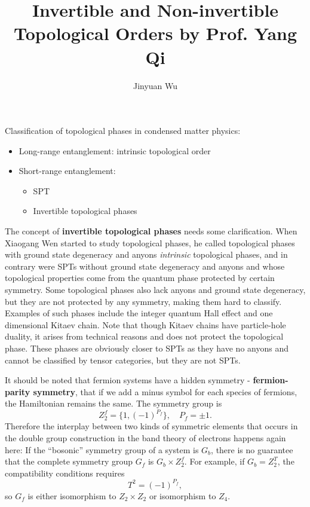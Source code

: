 \documentclass[hyperref, a4paper]{article}
\title{Invertible and Non-invertible Topological Orders by Prof. Yang Qi}
\author{Jinyuan Wu}
\newcommand*{\concept}[1]{{\textbf{#1}}}
\def\mathbb#1{#1}%
\begin{document}
\maketitle

Classification of topological phases in condensed matter physics:
\begin{itemize}
    \item Long-range entanglement: intrinsic topological order
    \item Short-range entanglement: 
    \begin{itemize}
        \item SPT
        \item Invertible topological phases
    \end{itemize}
\end{itemize}
The concept of \concept{invertible topological phases} needs some clarification. 
When Xiaogang Wen started to study topological phases, he called topological phases with ground state degeneracy and anyons \emph{intrinsic} topological phases, 
and in contrary were SPTs without ground state degeneracy and anyons and whose topological properties come from the quantum phase protected by certain symmetry.
Some topological phases also lack anyons and ground state degeneracy, but they are not protected by any symmetry, making them hard to classify.
Examples of such phases include the integer quantum Hall effect and one dimensional Kitaev chain.
Note that though Kitaev chains have particle-hole duality, it arises from technical reasons and does not protect the topological phase.
These phases are obviously closer to SPTs as they have no anyons and cannot be classified by tensor categories, but they are not SPTs.

It should be noted that fermion systems have a hidden symmetry - \concept{fermion-parity symmetry}, that if we add a minus symbol for each species of fermions, the Hamiltonian remains the same.
The symmetry group is 
\begin{equation}
    \mathbb{Z}_2^f = \{ 1, (-1)^{P_f} \}, \quad P_f = \pm 1.
\end{equation}
Therefore the interplay between two kinds of symmetric elements that occurs in the double group construction in the band theory of electrons happens again here: If the ``bosonic'' symmetry group of a system is $G_b$, there is no guarantee that the complete symmetry group $G_f$ is $G_b \times \mathbb{Z}_2^f$.
For example, if $G_b = \mathbb{Z}_2^T$, the compatibility conditions requires 
\begin{equation}
    T^2 = (-1)^{P_f},
\end{equation}
so $G_f$ is either isomorphism to $\mathbb{Z}_2 \times \mathbb{Z}_2$ or isomorphism to $\mathbb{Z}_4$.
\end{document}
